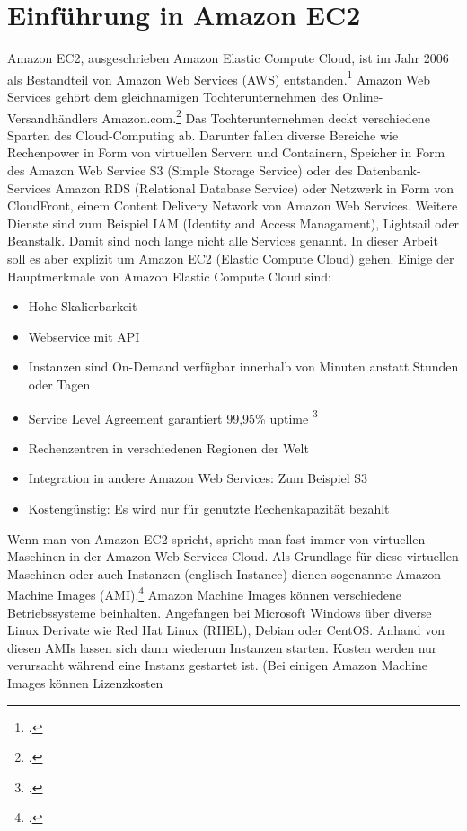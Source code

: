 \documentclass[titlepage]{report}
\begin{document}
\section*{Einführung in Amazon EC2}
Amazon EC2, ausgeschrieben Amazon Elastic Compute Cloud, ist im Jahr
2006 als Bestandteil von Amazon Web Services (AWS)
entstanden.\footcite{Incb} Amazon Web Services gehört dem gleichnamigen
Tochterunternehmen des Online-Versandhändlers Amazon.com.\footcite{Fou}
Das Tochterunternehmen deckt verschiedene Sparten des Cloud-Computing
ab. Darunter fallen diverse Bereiche wie Rechenpower in Form von
virtuellen Servern und Containern, Speicher in Form des Amazon Web
Service S3 (Simple Storage Service) oder des Datenbank-Services Amazon
RDS (Relational Database Service) oder Netzwerk in Form von CloudFront,
einem Content Delivery Network von Amazon Web Services. Weitere Dienste
sind zum Beispiel IAM (Identity and Access Managament), Lightsail oder Beanstalk.
Damit sind noch lange nicht alle Services genannt. In dieser Arbeit soll
es aber explizit um Amazon EC2 (Elastic Compute Cloud) gehen. Einige der
Hauptmerkmale von Amazon Elastic Compute Cloud sind:
\begin{itemize}
    \item Hohe Skalierbarkeit
    \item Webservice mit API
    \item Instanzen sind On-Demand verfügbar innerhalb von Minuten anstatt Stunden oder Tagen
    \item Service Level Agreement garantiert 99,95\% uptime \footcite{Inca}
    \item Rechenzentren in verschiedenen Regionen der Welt
    \item Integration in andere Amazon Web Services: Zum Beispiel S3
    \item Kostengünstig: Es wird nur für genutzte Rechenkapazität bezahlt
\end{itemize}
Wenn man von Amazon EC2 spricht, spricht man fast immer von virtuellen
Maschinen in der Amazon Web Services Cloud. Als Grundlage für diese
virtuellen Maschinen oder auch Instanzen (englisch Instance) dienen
sogenannte Amazon Machine Images (AMI).\footcite{Incc} Amazon Machine
Images können verschiedene Betriebssysteme beinhalten. Angefangen bei
Microsoft Windows über diverse Linux Derivate wie Red Hat Linux (RHEL),
Debian oder CentOS. Anhand von diesen AMIs lassen sich dann wiederum
Instanzen starten. Kosten werden nur verursacht während eine Instanz
gestartet ist. (Bei einigen Amazon Machine Images können Lizenzkosten
\end{document}
